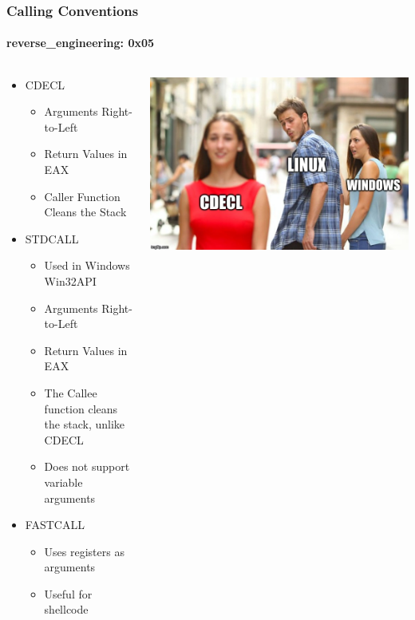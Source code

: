 \documentclass[aspectratio=169]{beamer}
\begin{document}
\begin{frame}
  \frametitle{Calling Conventions}
  \framesubtitle{reverse\_engineering: 0x05}
  \begin{columns}
    \begin{column}{.5\textwidth}
      \begin{itemize}
      \item{CDECL}
        \begin{itemize}
        \item{Arguments Right-to-Left}
        \item{Return Values in EAX}
        \item{Caller Function Cleans the Stack}
        \end{itemize}
      \item{STDCALL}
        \begin{itemize}
        \item{Used in Windows Win32API}
        \item{Arguments Right-to-Left}
        \item{Return Values in EAX}
        \item{The Callee function cleans the stack, unlike CDECL}
        \item{Does not support variable arguments}
        \end{itemize}
      \item{FASTCALL}
        \begin{itemize}
        \item{Uses registers as arguments}
        \item{Useful for shellcode}
        \end{itemize}
      \end{itemize}
    \end{column}
    \hfill
    \begin{column}{.5\textwidth}
      \begin{center}
        \includegraphics[scale=0.27]{cdecl-meme}
      \end{center}
    \end{column}
  \end{columns}
\end{frame}
\end{document}

